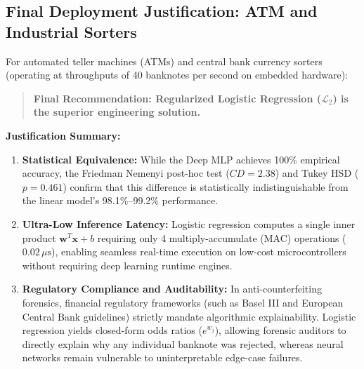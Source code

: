 \documentclass[12pt,a4paper]{article}
\begin{document}
\subsection{Final Deployment Justification: ATM and Industrial Sorters}
For automated teller machines (ATMs) and central bank currency sorters (operating at throughputs of 40 banknotes per second on embedded hardware):
\begin{quote}
\textbf{Final Recommendation: Regularized Logistic Regression ($\mathcal{L}_2$) is the superior engineering solution.}
\end{quote}
\textbf{Justification Summary:}
\begin{enumerate}
    \item \textbf{Statistical Equivalence:} While the Deep MLP achieves 100\% empirical accuracy, the Friedman Nemenyi post-hoc test ($CD = 2.38$) and Tukey HSD ($p = 0.461$) confirm that this difference is statistically indistinguishable from the linear model's 98.1\%--99.2\% performance.
    \item \textbf{Ultra-Low Inference Latency:} Logistic regression computes a single inner product $\mathbf{w}^T \mathbf{x} + b$ requiring only 4 multiply-accumulate (MAC) operations ($0.02\, \mu\text{s}$), enabling seamless real-time execution on low-cost microcontrollers without requiring deep learning runtime engines.
    \item \textbf{Regulatory Compliance and Auditability:} In anti-counterfeiting forensics, financial regulatory frameworks (such as Basel III and European Central Bank guidelines) strictly mandate algorithmic explainability. Logistic regression yields closed-form odds ratios ($e^{w_j}$), allowing forensic auditors to directly explain why any individual banknote was rejected, whereas neural networks remain vulnerable to uninterpretable edge-case failures.
\end{enumerate}
\end{document}
